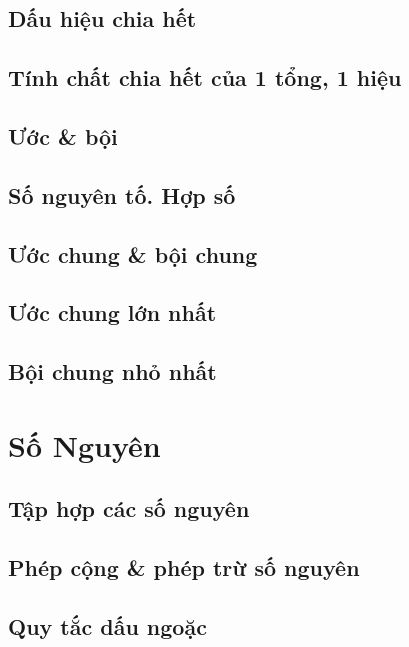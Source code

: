 \documentclass{article}
\numberwithin{equation}{section}
\begin{document}
\subsection{Dấu hiệu chia hết}

\subsection{Tính chất chia hết của 1 tổng, 1 hiệu}

\subsection{Ước \& bội}

\subsection{Số nguyên tố. Hợp số}

\subsection{Ước chung \& bội chung}

\subsection{Ước chung lớn nhất}

\subsection{Bội chung nhỏ nhất}


\section{Số Nguyên}

\subsection{Tập hợp các số nguyên}

\subsection{Phép cộng \& phép trừ số nguyên}

\subsection{Quy tắc dấu ngoặc}
\end{document}
